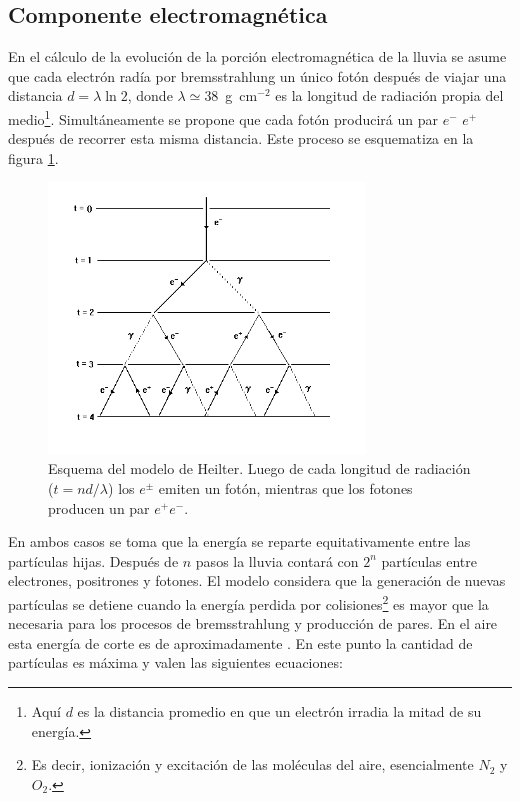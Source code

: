 \subsection{Componente electromagnética}
En el cálculo de la evolución de la porción electromagnética de la lluvia se asume que cada electrón radía por bremsstrahlung un único fotón después de viajar una distancia $d=\lambda \ln 2$, donde $\lambda\simeq38$~g~cm$^{-2}$ es la longitud de radiación propia del medio\footnote{Aqu\'i $d$ es la distancia promedio en que un electrón irradia la mitad de su energía.}. Simultáneamente se propone que cada fotón producirá un par $e^{-}$ $e^{+}$ después de recorrer esta misma distancia.
Este proceso se esquematiza en la figura \ref{fig:heilter}.
%
\begin{figure}[ht]
\begin{center}
\includegraphics[width=0.75\textwidth]{fig/EASAuger/heilterSchema}
\caption{Esquema del modelo de Heilter. Luego de cada longitud de radiación ($t=nd/\lambda$) los $e^\pm$ emiten un fotón, mientras que los fotones producen un par $e^+e^-$.}
\label{fig:heilter}
\end{center}
\end{figure}
%
En ambos casos se toma que la energía se reparte equitativamente entre las partículas hijas. Después de $n$ pasos la lluvia contará con $2^{n}$ partículas entre electrones, positrones y fotones. El modelo considera que la generación de nuevas partículas se detiene cuando la energía perdida por colisiones\footnote{Es decir, ionizaci\'on y excitaci\'on de las mol\'eculas del aire, esencialmente $N_2$ y $O_2$.} es mayor que la necesaria para los procesos de bremsstrahlung y producción de pares. En el aire esta energía de corte es de aproximadamente . En este punto la cantidad de partículas es máxima y valen las siguientes ecuaciones:
